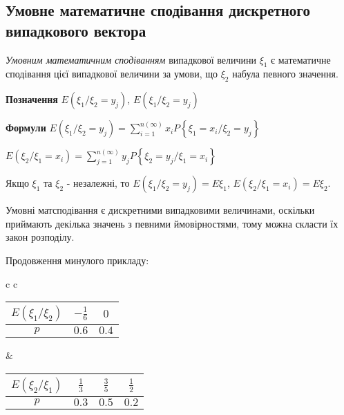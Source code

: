 \subsection{Умовне математичне сподівання дискретного випадкового вектора}
\begin{definition}
    \emph{Умовним математичним сподіванням} випадкової величини $\xi_1$ 
    є математичне сподівання цієї випадкової величини за умови, що 
    $\xi_2$ набула певного значення.
\end{definition}

\noindent \textbf{Позначення} $E(\xi_1 / \xi_2 = y_j)$, 
$E(\xi_1 / \xi_2 = y_j)$

\noindent \textbf{Формули} $E(\xi_1 / \xi_2 = y_j) = 
\sum\limits_{i=1}^{n(\infty)}x_i 
P\left\{\xi_1 = x_i / \xi_2 = y_j\right\}$

$E(\xi_2 / \xi_1 = x_i) = 
\sum\limits_{j=1}^{n(\infty)}y_j 
P\left\{\xi_2 = y_j / \xi_1 = x_i\right\}$

\begin{remark}
    Якщо $\xi_1$ та $\xi_2$ - незалежні, то $E(\xi_1 / \xi_2 = y_j) 
    = E\xi_1$, $E(\xi_2 / \xi_1 = x_i) = E\xi_2$.
\end{remark}

Умовні матсподівання є дискретними випадковими величинами, оскільки 
приймають декілька значень з певними ймовірностями, тому можна скласти 
їх закон розподілу.

\begin{example}
    Продовження минулого прикладу:

    \begin{tabular}{c c}
        \begin{tabular}{|c|c|c|}
            \hline
            $E(\xi_1 / \xi_2)$ & $-\frac{1}{6}$ & $0$ \\
            \hline
            $p$ & $0.6$ & $0.4$ \\
            \hline
        \end{tabular}
        &
        \begin{tabular}{|c|c|c|c|}
            \hline
            $E(\xi_2 / \xi_1)$ & $\frac{1}{3}$ & $\frac{3}{5}$ 
            & $\frac{1}{2}$ \\
            \hline
            $p$ & $0.3$ & $0.5$ & $0.2$ \\
            \hline
        \end{tabular}
    \end{tabular}
\end{example}
